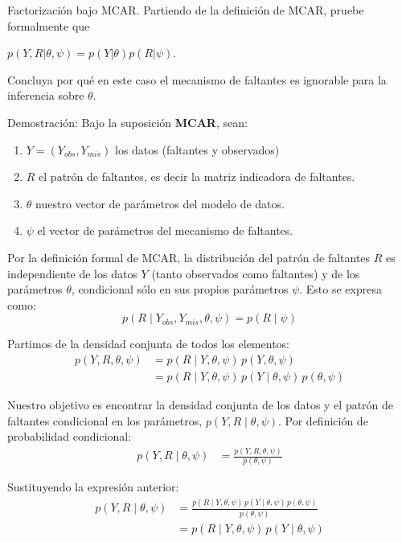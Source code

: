 \documentclass[a4paper,11pt]{article}
\begin{document}
\newpage
\begin{ejercicio}{4}
    Factorización bajo MCAR.
    Partiendo de la definición de MCAR, pruebe formalmente que

    $p(Y, R | \theta, \psi) = p(Y | \theta) p(R | \psi)$.

    Concluya por qué en este caso el mecanismo de faltantes es ignorable para la inferencia
    sobre $\theta$.
\end{ejercicio}
\begin{demostracion}{Demostración:}
    Bajo la suposición \textbf{MCAR}, sean:
    \begin{enumerate}
        \item $Y=(Y_{obs},Y_{mis} )$ los datos (faltantes y observados)
        \item $R$ el patrón de faltantes, es decir la matriz indicadora de faltantes.
        \item $\theta$ nuestro vector de parámetros del modelo de datos.
        \item $\psi$ el vector de parámetros del mecanismo de faltantes.
    \end{enumerate}

    Por la definición formal de MCAR, la distribución del patrón de faltantes $R$ es independiente de los datos $Y$ (tanto observados como faltantes) y de los parámetros $\theta$, condicional sólo en sus propios parámetros $\psi$. Esto se expresa como:
    \[
        p(R \mid Y_{obs}, Y_{mis}, \theta, \psi) = p(R \mid \psi)
    \]

    Partimos de la densidad conjunta de todos los elementos:
    \begin{align*}
        p(Y, R, \theta, \psi) & = p(R \mid Y, \theta, \psi) \, p(Y, \theta, \psi)                        \\
                              & = p(R \mid Y, \theta, \psi) \, p(Y \mid \theta, \psi) \, p(\theta, \psi)
    \end{align*}

    Nuestro objetivo es encontrar la densidad conjunta de los datos y el patrón de faltantes condicional en los parámetros, $p(Y, R \mid \theta, \psi)$. Por definición de probabilidad condicional:
    \begin{align*}
        p(Y, R \mid \theta, \psi) & = \frac{p(Y, R, \theta, \psi)}{p(\theta, \psi)}
    \end{align*}

    Sustituyendo la expresión anterior:
    \begin{align*}
        p(Y, R \mid \theta, \psi) & = \frac{p(R \mid Y, \theta, \psi) \, p(Y \mid \theta, \psi) \, p(\theta, \psi)}{p(\theta, \psi)} \\
                                  & = p(R \mid Y, \theta, \psi) \, p(Y \mid \theta, \psi)
    \end{align*}


\end{demostracion}
\end{document}
